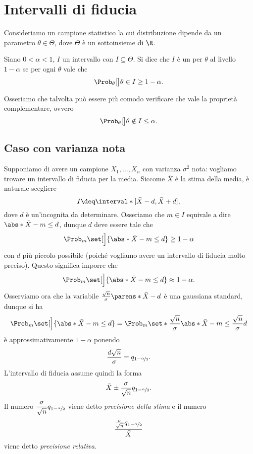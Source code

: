 \section{Intervalli di fiducia}

Consideriamo un campione statistico la cui distribuzione dipende da un parametro $\theta \in \Theta$, dove $\Theta$ è un sottoinsieme di $\R$.
\begin{definition}
    Siano $0 < \alpha < 1$, $I$ un intervallo con $I \subseteq \Theta$. Si dice che $I$ è un  per $\theta$ al livello $1 - \alpha$ se per ogni $\theta$ vale che \[
        \Prob_\theta[\big]{\theta \in I} \geq 1 - \alpha.    
    \]
\end{definition}

Osseriamo che talvolta può essere più comodo verificare che vale la proprietà complementare, ovvero \[
    \Prob_\theta[\big]{\theta \notin I} \leq \alpha.    
\]

\subsection*{Caso con varianza nota}

Supponiamo di avere un campione $X_1, \dots, X_n$ con varianza $\sigma^2$ nota: vogliamo trovare un intervallo di fiducia per la media. Siccome $\bar X$ è la stima della media, è naturale scegliere \[
    I \deq \interval*[{\bar X - d, \bar X + d}],    
\] dove $d$ è un'incognita da determinare. Osseriamo che $m \in I$ equivale a dire $\abs*{\bar X - m} \leq d$, dunque $d$ deve essere tale che \[
    \Prob_m\set[\Big]{\abs*{\bar X - m} \leq d} \geq 1 - \alpha    
\] con $d$ più piccolo possibile (poiché vogliamo avere un intervallo di fiducia molto preciso). Questo significa imporre che \[
    \Prob_m\set[\Big]{\abs*{\bar X - m} \leq d} \approx 1 - \alpha.
\] Osserviamo ora che la variabile $\frac{\sqrt{n}}{\sigma} \parens*{\bar X - d}$ è una gaussiana standard, dunque si ha \[
    \Prob_m\set[\Big]{\abs*{\bar X - m} \leq d} = \Prob_m\set*{\frac{\sqrt{n}}{\sigma}\abs*{\bar X - m} \leq \frac{\sqrt{n}}{\sigma}d}
\] è approssimativamente $1 - \alpha$ ponendo \[
    \frac{d\sqrt{n}}{\sigma} = q_{1 - \nicefrac{\alpha}{2}}.
\]
L'intervallo di fiducia assume quindi la forma \[
    \bar X \pm \frac{\sigma}{\sqrt{n}}q_{1-\nicefrac{\alpha}{2}}.
\] Il numero $\dfrac{\sigma}{\sqrt{n}}q_{1-\nicefrac{\alpha}{2}}$ viene detto \emph{precisione della stima} e il numero \[
    \frac{\frac{\sigma}{\sqrt{n}}q_{1-\nicefrac{\alpha}{2}}}{\bar X}    
\] viene detto \emph{precisione relativa}.

